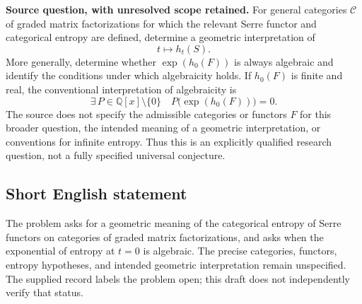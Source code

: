 \documentclass[11pt]{article}
\newcommand{\Q}{\mathbb{Q}}
\begin{document}
\textbf{Source question, with unresolved scope retained.} For general categories \(\mathcal C\) of graded matrix factorizations for which the relevant Serre functor and categorical entropy are defined, determine a geometric interpretation of
\[
t\longmapsto h_t(S).
\]
More generally, determine whether \(\exp(h_0(F))\) is always algebraic and identify the conditions under which algebraicity holds. If \(h_0(F)\) is finite and real, the conventional interpretation of algebraicity is
\[
\exists\,P\in\Q[x]\setminus\{0\}\quad P\bigl(\exp(h_0(F))\bigr)=0.
\]
The source does not specify the admissible categories or functors \(F\) for this broader question, the intended meaning of a geometric interpretation, or conventions for infinite entropy. Thus this is an explicitly qualified research question, not a fully specified universal conjecture.
\subsection{Short English statement}
The problem asks for a geometric meaning of the categorical entropy of Serre functors on categories of graded matrix factorizations, and asks when the exponential of entropy at \(t=0\) is algebraic. The precise categories, functors, entropy hypotheses, and intended geometric interpretation remain unspecified. The supplied record labels the problem open; this draft does not independently verify that status.
\end{document}
